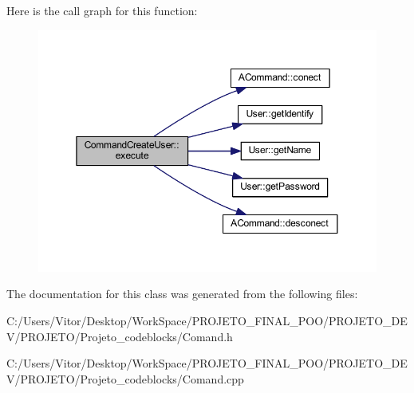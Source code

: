 Here is the call graph for this function\-:\nopagebreak
\begin{figure}[H]
\begin{center}
\leavevmode
\includegraphics[width=350pt]{class_command_create_user_a63ef962dcd3713947dc1fdbcf6a4039e_cgraph}
\end{center}
\end{figure}




The documentation for this class was generated from the following files\-:\begin{DoxyCompactItemize}
\item 
C\-:/\-Users/\-Vitor/\-Desktop/\-Work\-Space/\-P\-R\-O\-J\-E\-T\-O\-\_\-\-F\-I\-N\-A\-L\-\_\-\-P\-O\-O/\-P\-R\-O\-J\-E\-T\-O\-\_\-\-D\-E\-V/\-P\-R\-O\-J\-E\-T\-O/\-Projeto\-\_\-codeblocks/Comand.\-h\item 
C\-:/\-Users/\-Vitor/\-Desktop/\-Work\-Space/\-P\-R\-O\-J\-E\-T\-O\-\_\-\-F\-I\-N\-A\-L\-\_\-\-P\-O\-O/\-P\-R\-O\-J\-E\-T\-O\-\_\-\-D\-E\-V/\-P\-R\-O\-J\-E\-T\-O/\-Projeto\-\_\-codeblocks/Comand.\-cpp\end{DoxyCompactItemize}
